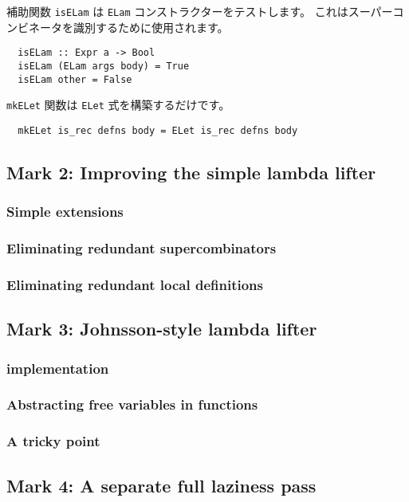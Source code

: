 \documentclass{jarticle}
\begin{document}
補助関数 \texttt{isELam} は \texttt{ELam} コンストラクターをテストします。
これはスーパーコンビネータを識別するために使用されます。

\begin{verbatim}
  isELam :: Expr a -> Bool
  isELam (ELam args body) = True
  isELam other = False
\end{verbatim}

\texttt{mkELet} 関数は \texttt{ELet} 式を構築するだけです。

\begin{verbatim}
  mkELet is_rec defns body = ELet is_rec defns body
\end{verbatim}

\subsection{Mark 2: Improving the simple lambda lifter}
\subsubsection{Simple extensions}
\subsubsection{Eliminating redundant supercombinators}
\subsubsection{Eliminating redundant local definitions}
\newpage

\subsection{Mark 3: Johnsson-style lambda lifter}
\subsubsection{implementation}
\subsubsection{Abstracting free variables in functions}
\subsubsection{A tricky point \dag}
\newpage

\subsection{Mark 4: A separate full laziness pass}
\end{document}
